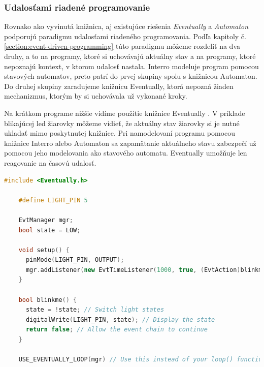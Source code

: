 \subsubsection{Udalosťami riadené programovanie}
\noindent \par
Rovnako ako vyvinutá knižnica, aj existujúce riešenia \textit{Eventually} a \textit{Automaton} podporujú paradigmu udalosťami riadeného programovania. Podľa kapitoly
č.\ref{section:event-driven-programming} túto paradigmu môžeme rozdeliť na dva druhy, a to na programy, ktoré si uchovávajú aktuálny stav a na programy, ktoré nepoznajú
kontext, v ktorom udalosť nastala. Interro modeluje program pomocou stavových automatov, preto patrí do prvej skupiny spolu s knižnicou Automaton. Do druhej skupiny
zaraďujeme knižnicu Eventually, ktorá nepozná žiaden mechanizmus, ktorým by si uchovávala už vykonané kroky. \par
Na krátkom programe nižšie vidíme použitie knižnice Eventually \cite{bartlettEventually2021}. V príklade blikajúcej led žiarovky môžeme vidieť,
že aktuálny stav žiarovky si je nutné ukladať mimo poskytnutej knižnice. Pri namodelovaní programu pomocou knižnice Interro alebo Automaton
sa zapamätanie aktuálneho stavu zabezpečí už pomocou jeho modelovania ako stavového automatu. Eventually umožňuje len reagovanie na časovú udalosť.
\begin{lstlisting}[language=c++]      
    #include <Eventually.h>       

    #define LIGHT_PIN 5    

    EvtManager mgr;
    bool state = LOW;    

    void setup() {
      pinMode(LIGHT_PIN, OUTPUT);
      mgr.addListener(new EvtTimeListener(1000, true, (EvtAction)blinkme)); 
    }    

    bool blinkme() {
      state = !state; // Switch light states
      digitalWrite(LIGHT_PIN, state); // Display the state
      return false; // Allow the event chain to continue
    }    

    USE_EVENTUALLY_LOOP(mgr) // Use this instead of your loop() function.    
\end{lstlisting}

